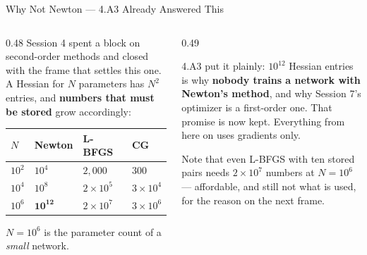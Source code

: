 \begin{frame}{Why Not Newton --- 4.A3 Already Answered This}
\begin{columns}[T]
\begin{column}{0.48\textwidth}
\small
Session 4 spent a block on second-order methods and closed with the frame that settles this one. A Hessian for $N$ parameters has $N^{2}$ entries, and \textbf{numbers that must be stored} grow accordingly:
\medskip

\begin{center}\footnotesize
\begin{tabularx}{\linewidth}{@{}>{\raggedright\arraybackslash}p{1.35cm} >{\raggedleft\arraybackslash}X >{\raggedleft\arraybackslash}X >{\raggedleft\arraybackslash}X@{}}
\toprule
$N$ & \textbf{Newton} & \textbf{L-BFGS} & \textbf{CG} \\
\midrule
$10^{2}$ & $10^{4}$ & $2{,}000$ & $300$ \\
$10^{4}$ & $10^{8}$ & $2\times10^{5}$ & $3\times10^{4}$ \\
$10^{6}$ & $\mathbf{10^{12}}$ & $2\times10^{7}$ & $3\times10^{6}$ \\
\bottomrule
\end{tabularx}
\end{center}
\medskip
$N=10^{6}$ is the parameter count of a \emph{small} network.
\end{column}
\begin{column}{0.49\textwidth}
\begin{cautionbox}[title=\textbf{The frame this cites}]\small
4.A3 put it plainly: $10^{12}$ Hessian entries is why \textbf{nobody trains a network with Newton's method}, and why Session 7's optimizer is a first-order one.
\medskip
That promise is now kept. Everything from here on uses gradients only.
\end{cautionbox}
\medskip
\begin{examplebox}\footnotesize
Note that even L-BFGS with ten stored pairs needs $2\times10^{7}$ numbers at $N=10^{6}$ --- affordable, and still not what is used, for the reason on the next frame.
\end{examplebox}
\end{column}
\end{columns}
\vspace{1mm}
\end{frame}

